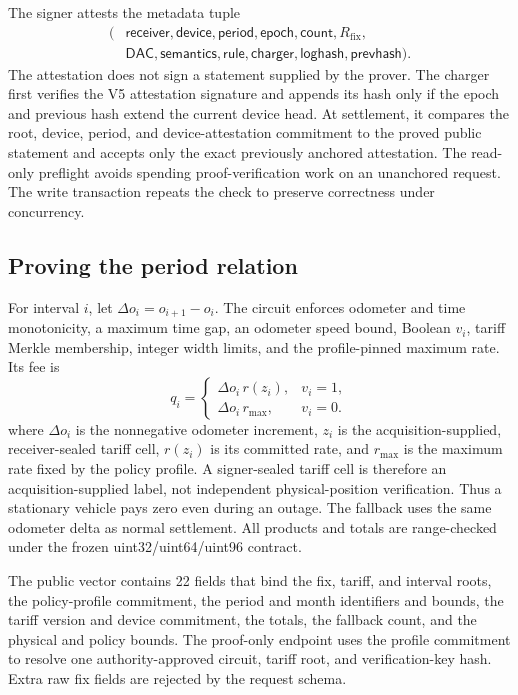 \documentclass[conference]{IEEEtran}
\theoremstyle{plain}
\theoremstyle{definition}
\newcommand{\rmax}{r_{\max}}
\begin{document}
The signer attests the metadata tuple
\begin{align*}
(&\mathsf{receiver},\mathsf{device},\mathsf{period},\mathsf{epoch},
\mathsf{count},R_{\mathrm{fix}},\\
 &\mathsf{DAC},\mathsf{semantics},\mathsf{rule},\mathsf{charger},
 \mathsf{loghash},\mathsf{prevhash}).
\end{align*}
The attestation does not sign a statement supplied by the prover. The charger
first verifies the V5 attestation signature and appends its hash only if the epoch and
previous hash extend the current device head. At settlement, it compares the
root, device, period, and device-attestation commitment to the proved public
statement and accepts only the exact previously anchored attestation. The
read-only preflight avoids spending proof-verification work on an unanchored
request. The write transaction repeats the check to preserve correctness under
concurrency.

\subsection{Proving the period relation}

For interval $i$, let $\Delta o_i=o_{i+1}-o_i$. The circuit enforces odometer
and time monotonicity, a maximum time gap, an odometer speed bound, Boolean
$v_i$, tariff Merkle membership, integer width limits, and the profile-pinned
maximum rate. Its fee is
\[
 q_i=\begin{cases}
 \Delta o_i\,r(z_i),&v_i=1,\\
 \Delta o_i\,\rmax,&v_i=0.
 \end{cases}
\]
where $\Delta o_i$ is the nonnegative odometer increment, $z_i$ is
the acquisition-supplied, receiver-sealed tariff cell, $r(z_i)$ is its committed rate, and
$\rmax$ is the maximum rate fixed by the policy profile. A signer-sealed tariff
cell is therefore an acquisition-supplied label, not independent
physical-position verification.
Thus a stationary vehicle pays zero even during an outage. The fallback uses
the same odometer delta as normal settlement. All products and totals are
range-checked under the frozen uint32/uint64/uint96 contract.

The public vector contains 22 fields that bind the fix, tariff, and
interval roots, the policy-profile commitment, the period and month identifiers
and bounds, the tariff version and device commitment, the totals, the fallback
count, and the physical and policy bounds. The proof-only endpoint uses the
profile commitment to resolve one authority-approved circuit, tariff root, and
verification-key hash. Extra raw fix fields are rejected by the request
schema.
\end{document}
